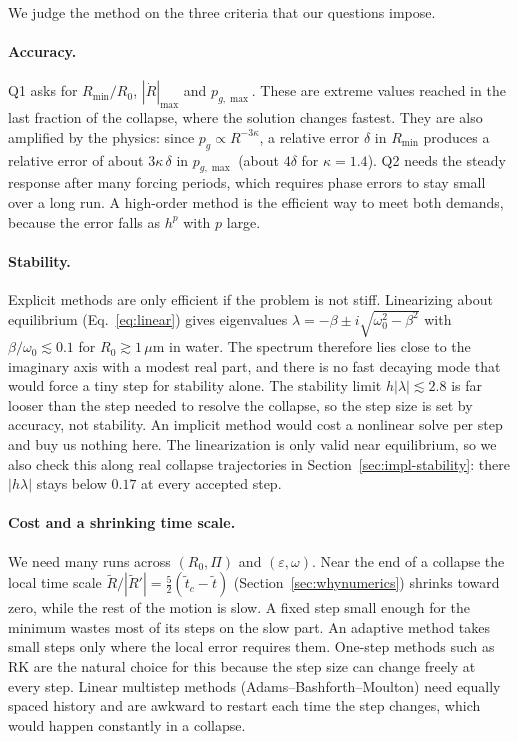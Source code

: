 We judge the method on the three criteria that our questions impose.

\paragraph{Accuracy.} Q1 asks for $R_{\min}/R_0$, $|\dot R|_{\max}$ and $p_{g,\max}$. These are extreme values reached in the last fraction of the collapse, where the solution changes fastest. They are also amplified by the physics: since $p_g\propto R^{-3\kappa}$, a relative error $\delta$ in $R_{\min}$ produces a relative error of about $3\kappa\,\delta$ in $p_{g,\max}$ (about $4\delta$ for $\kappa=1.4$). Q2 needs the steady response after many forcing periods, which requires phase errors to stay small over a long run. A high-order method is the efficient way to meet both demands, because the error falls as $h^{p}$ with $p$ large.

\paragraph{Stability.} Explicit methods are only efficient if the problem is not stiff. Linearizing about equilibrium (Eq.~\eqref{eq:linear}) gives eigenvalues $\lambda=-\beta\pm i\sqrt{\omega_0^2-\beta^2}$ with $\beta/\omega_0\lesssim0.1$ for $R_0\gtrsim1\,\mu$m in water. The spectrum therefore lies close to the imaginary axis with a modest real part, and there is no fast decaying mode that would force a tiny step for stability alone. The stability limit $h|\lambda|\lesssim2.8$ is far looser than the step needed to resolve the collapse, so the step size is set by accuracy, not stability. An implicit method would cost a nonlinear solve per step and buy us nothing here. The linearization is only valid near equilibrium, so we also check this along real collapse trajectories in Section~\ref{sec:impl-stability}: there $|h\lambda|$ stays below $0.17$ at every accepted step.

\paragraph{Cost and a shrinking time scale.} We need many runs across $(R_0,\Pi)$ and $(\varepsilon,\omega)$. Near the end of a collapse the local time scale $\tilde R/|\tilde R'|=\tfrac52(\tilde t_c-\tilde t)$ (Section~\ref{sec:whynumerics}) shrinks toward zero, while the rest of the motion is slow. A fixed step small enough for the minimum wastes most of its steps on the slow part. An adaptive method takes small steps only where the local error requires them. One-step methods such as RK are the natural choice for this because the step size can change freely at every step. Linear multistep methods (Adams--Bashforth--Moulton) need equally spaced history and are awkward to restart each time the step changes, which would happen constantly in a collapse.

